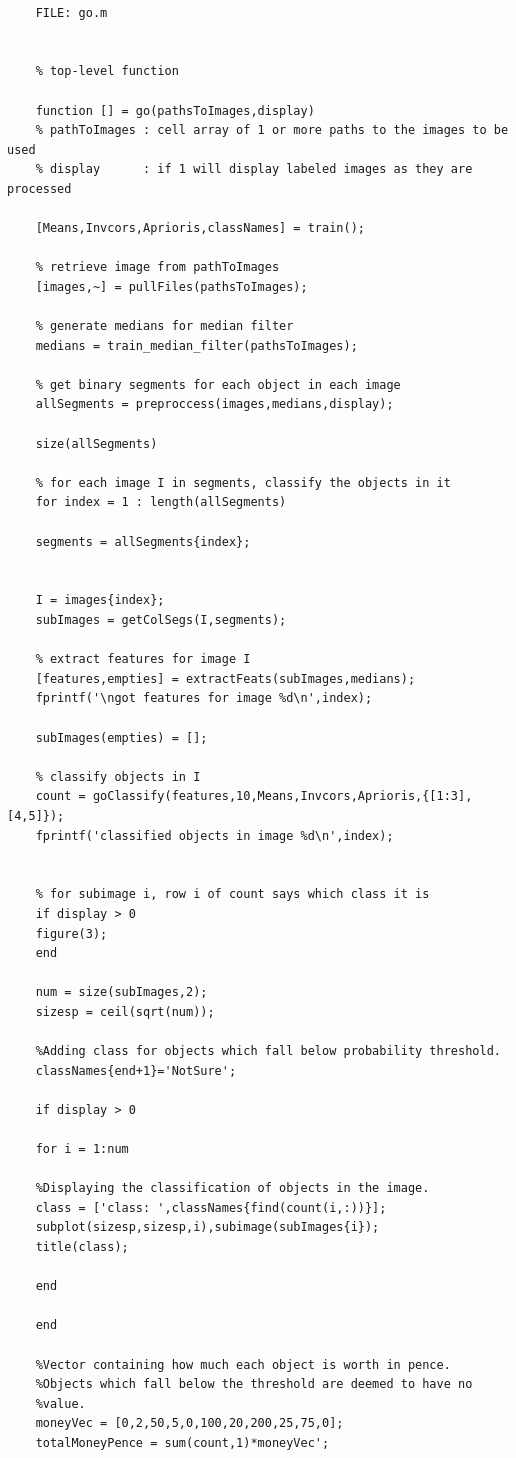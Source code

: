 \documentclass[12pt]{article}
\begin{document}
\begin{verbatim}
	
	FILE: go.m
	
	
	% top-level function 
	
	function [] = go(pathsToImages,display)
	% pathToImages : cell array of 1 or more paths to the images to be used
	% display      : if 1 will display labeled images as they are processed
	
	[Means,Invcors,Aprioris,classNames] = train();
	
	% retrieve image from pathToImages
	[images,~] = pullFiles(pathsToImages);
	
	% generate medians for median filter
	medians = train_median_filter(pathsToImages);
	
	% get binary segments for each object in each image
	allSegments = preproccess(images,medians,display);
	
	size(allSegments)
	
	% for each image I in segments, classify the objects in it
	for index = 1 : length(allSegments)
	
	segments = allSegments{index};
	
	
	I = images{index};
	subImages = getColSegs(I,segments);
	
	% extract features for image I
	[features,empties] = extractFeats(subImages,medians);
	fprintf('\ngot features for image %d\n',index);
	
	subImages(empties) = [];
	
	% classify objects in I
	count = goClassify(features,10,Means,Invcors,Aprioris,{[1:3],[4,5]});
	fprintf('classified objects in image %d\n',index);
	
	
	% for subimage i, row i of count says which class it is
	if display > 0
	figure(3);
	end
	
	num = size(subImages,2);
	sizesp = ceil(sqrt(num));
	
	%Adding class for objects which fall below probability threshold.
	classNames{end+1}='NotSure';
	
	if display > 0
	
	for i = 1:num
	
	%Displaying the classification of objects in the image.
	class = ['class: ',classNames{find(count(i,:))}];
	subplot(sizesp,sizesp,i),subimage(subImages{i});
	title(class);
	
	end
	
	end
	
	%Vector containing how much each object is worth in pence.
	%Objects which fall below the threshold are deemed to have no
	%value.
	moneyVec = [0,2,50,5,0,100,20,200,25,75,0];
	totalMoneyPence = sum(count,1)*moneyVec';
	

\end{verbatim}
\end{document}
